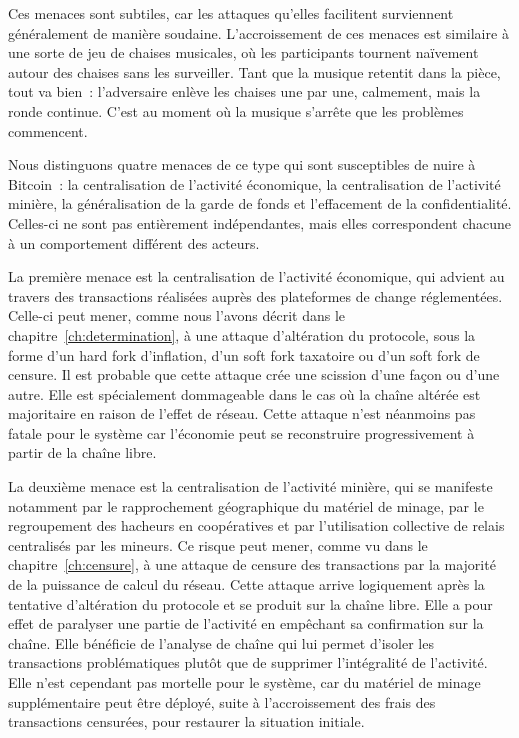 Ces menaces sont subtiles, car les attaques qu'elles facilitent surviennent généralement de manière soudaine. L'accroissement de ces menaces est similaire à une sorte de jeu de chaises musicales, où les participants tournent naïvement autour des chaises sans les surveiller. Tant que la musique retentit dans la pièce, tout va bien~: l'adversaire enlève les chaises une par une, calmement, mais la ronde continue. C'est au moment où la musique s'arrête que les problèmes commencent.

Nous distinguons quatre menaces de ce type qui sont susceptibles de nuire à Bitcoin~: la centralisation de l'activité économique, la centralisation de l'activité minière, la généralisation de la garde de fonds et l'effacement de la confidentialité. Celles-ci ne sont pas entièrement indépendantes, mais elles correspondent chacune à un comportement différent des acteurs.

La première menace est la centralisation de l'activité économique, qui advient au travers des transactions réalisées auprès des plateformes de change réglementées. Celle-ci peut mener, comme nous l'avons décrit dans le chapitre~\ref{ch:determination}, à une attaque d'altération du protocole, sous la forme d'un hard fork d'inflation, d'un soft fork taxatoire ou d'un soft fork de censure. Il est probable que cette attaque crée une scission d'une façon ou d'une autre. Elle est spécialement dommageable dans le cas où la chaîne altérée est majoritaire en raison de l'effet de réseau. Cette attaque n'est néanmoins pas fatale pour le système car l'économie peut se reconstruire progressivement à partir de la chaîne libre.

La deuxième menace est la centralisation de l'activité minière, qui se manifeste notamment par le rapprochement géographique du matériel de minage, par le regroupement des hacheurs en coopératives et par l'utilisation collective de relais centralisés par les mineurs. Ce risque peut mener, comme vu dans le chapitre~\ref{ch:censure}, à une attaque de censure des transactions par la majorité de la puissance de calcul du réseau. Cette attaque arrive logiquement après la tentative d'altération du protocole et se produit sur la chaîne libre. Elle a pour effet de paralyser une partie de l'activité en empêchant sa confirmation sur la chaîne. Elle bénéficie de l'analyse de chaîne qui lui permet d'isoler les transactions problématiques plutôt que de supprimer l'intégralité de l'activité. Elle n'est cependant pas mortelle pour le système, car du matériel de minage supplémentaire peut être déployé, suite à l'accroissement des frais des transactions censurées, pour restaurer la situation initiale. %

